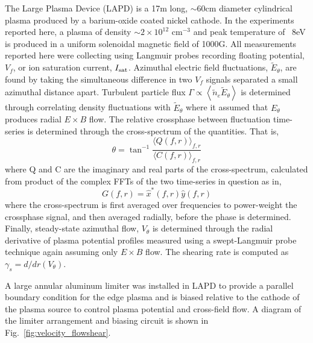 \documentclass[aip,pop,amsmath,amssymb,preprint,superscriptaddress]{revtex4-1} %
\begin{document}
The Large Plasma Device \cite{gek91} (LAPD) is a 17m long, $\sim$60cm diameter cylindrical plasma produced by a barium-oxide coated nickel cathode. In the experiments reported here, a plasma of density $\sim$$2 \times 10^{12}$ cm$^{-3}$ and peak temperature of ~8eV is produced in a uniform solenoidal magnetic field of 1000G. All measurements reported here were collecting using Langmuir probes recording floating potential, $V_{f}$, or ion saturation current, $I_{\rm sat}$. Azimuthal electric field fluctuations, $\tilde{E}_{\theta}$, are found by taking the simultaneous difference in two $V_{f}$ signals separated a small azimuthal distance apart. Turbulent particle flux $\Gamma \propto \left<\tilde{n}_e \tilde{E}_\theta\right>$ is determined through correlating density fluctuations with $\tilde{E}_{\theta}$ where it assumed that $E_{\theta}$ produces radial $E \times B$ flow. The relative crossphase between fluctuation time-series is determined through the cross-spectrum of the quantities. That is,
%
\begin{equation}
\theta = \tan^{-1}\frac{\langle Q(f,r)\rangle_{f,r}}{\langle C(f,r)\rangle_{f,r}}
\label{eq:crossphase}
\end{equation}
%
where Q and C are the imaginary and real parts of the cross-spectrum, calculated from product of the complex FFTs of the two time-series in question as in,
\begin{equation}
G(f,r) = \hat{x}^{\ast}(f,r)\hat{y}(f,r)
\label{eq:crossspectrum}
\end{equation}
%
where the cross-spectrum is first averaged over frequencies to power-weight the crossphase signal, and then averaged radially, before the phase is determined. Finally, steady-state azimuthal flow, $V_{\theta}$ is determined through the radial derivative of plasma potential profiles measured using a swept-Langmuir probe technique again assuming only $E \times B$ flow. The shearing rate is computed as $\gamma_{s} = d/dr(V_{\theta})$.

A large annular aluminum limiter was installed in LAPD to provide a parallel boundary condition for the edge plasma and is biased relative to the cathode of the plasma source to control plasma potential and cross-field flow.  A diagram of the limiter arrangement and biasing circuit is shown in Fig.~\ref{fig:velocity_flowshear}.
\end{document}
